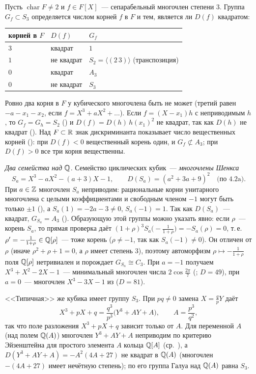 \begin{remark}
Пусть $\operatorname{char}F\ne2$ и $f\in F[X]$~--- сепарабельный многочлен степени $3$. Группа $G_f\subset S_3$ определяется
числом корней $f$ в $F$ и тем, является ли $D(f)$ квадратом:
\begin{center}
\begin{tabular}{@{}lll@{}}
\toprule
корней в $F$ & $D(f)$ & $G_f$\\
\midrule
$3$ & квадрат & $1$\\
$1$ & не квадрат & $S_2=\langle(2\,3)\rangle$ (транспозиция)\\
$0$ & квадрат & $A_3$\\
$0$ & не квадрат & $S_3$\\
\bottomrule
\end{tabular}
\end{center}
Ровно два корня в $F$ у кубического многочлена быть не может (третий равен $-a-x_1-x_2$, если $f=X^3+aX^2+\dots$). Если
$f=(X-x_1)h$ с неприводимым $h$, то $G_f=G_h=S_2$ () и $D(f)=D(h)\,h(x_1)^2$ не квадрат, так как $D(h)$ не квадрат
(). Над $F\subset\mathbb R$ знак дискриминанта показывает число вещественных корней (): при $D(f)<0$ вещественный корень
один, и $G_f\not\subset A_3$; при $D(f)>0$ все три корня вещественны.

\emph{Два семейства над $\mathbb Q$.} Семейство циклических кубик~--- \emph{многочлены Шенкса}
\[
S_a=X^3-aX^2-(a+3)X-1,\qquad D(S_a)=(a^2+3a+9)^2\quad\text{(по 4.2a)}.
\]
При $a\in\mathbb Z$ многочлен $S_a$ неприводим: рациональные корни унитарного многочлена с целыми коэффициентами и свободным
членом $-1$ могут быть только $\pm1$ (), а $S_a(1)=-2a-3\ne0$, $S_a(-1)=1$. Так как $D(S_a)$~--- квадрат, $G_{S_a}=A_3$ ().
Образующую этой группы можно указать явно: если $\rho$~--- корень $S_a$, то прямая проверка даёт $(1+\rho)^3S_a\bigl(-\frac1{1+\rho}\bigr)=-S_a(\rho)=0$, т.\,е.\
$\rho'=-\frac1{1+\rho}\in\mathbb Q[\rho]$~--- тоже корень ($\rho\ne-1$, так как $S_a(-1)\ne0$). Он отличен от $\rho$ (иначе $\rho^2+\rho+1=0$, а
$\rho$ имеет степень $3$), поэтому автоморфизм $\rho\mapsto-\frac1{1+\rho}$ поля $\mathbb Q[\rho]$ нетривиален и порождает $G_{S_a}\cong C_3$. При
$a=-1$ получаем $X^3+X^2-2X-1$~--- минимальный многочлен числа $2\cos\frac{2\pi}7$ (\rf{3.22}; $D=49$), при $a=0$~--- многочлен
$X^3-3X-1$ из \rf{1.12} ($D=81$).

<<Типичная>> же кубика имеет группу $S_3$. При $pq\ne0$ замена $X=\frac qpY$ даёт
\[
X^3+pX+q=\frac{q^3}{p^3}\bigl(Y^3+AY+A\bigr),\qquad A=\frac{p^3}{q^2},
\]
так что поле разложения $X^3+pX+q$ зависит только от $A$. Для переменной $A$ (над полем $\mathbb Q(A)$) многочлен $Y^3+AY+A$
неприводим по критерию Эйзенштейна для простого элемента $A$ кольца $\mathbb Q[A]$ (ср.\ \rf{1.16d}), а $D(Y^3+AY+A)=-A^2(4A+27)$ не
квадрат в $\mathbb Q(A)$ (многочлен $-(4A+27)$ имеет нечётную степень); по \rf{4.7} его группа Галуа над $\mathbb Q(A)$ равна $S_3$.
\end{remark}

